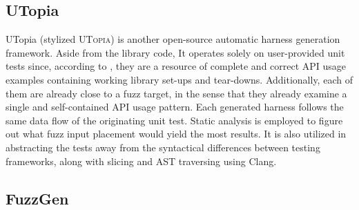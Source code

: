 \documentclass[
  a4paper,
  DIV=11,
  numbers=noendperiod]{scrreprt}
\theoremstyle{definition}
\theoremstyle{remark}
\begin{document}
\subsection{UTopia}\label{utopia}

UTopia \autocite{utopia} (stylized \textsc{UTopia}) is another
open-source automatic harness generation framework. Aside from the
library code, It operates solely on user-provided unit tests since,
according to \textcite{utopia}, they are a resource of complete and
correct API usage examples containing working library set-ups and
tear-downs. Additionally, each of them are already close to a fuzz
target, in the sense that they already examine a single and
self-contained API usage pattern. Each generated harness follows the
same data flow of the originating unit test. Static analysis is employed
to figure out what fuzz input placement would yield the most results. It
is also utilized in abstracting the tests away from the syntactical
differences between testing frameworks, along with slicing and AST
traversing using Clang.

\subsection{FuzzGen}\label{fuzzgen}
\end{document}
